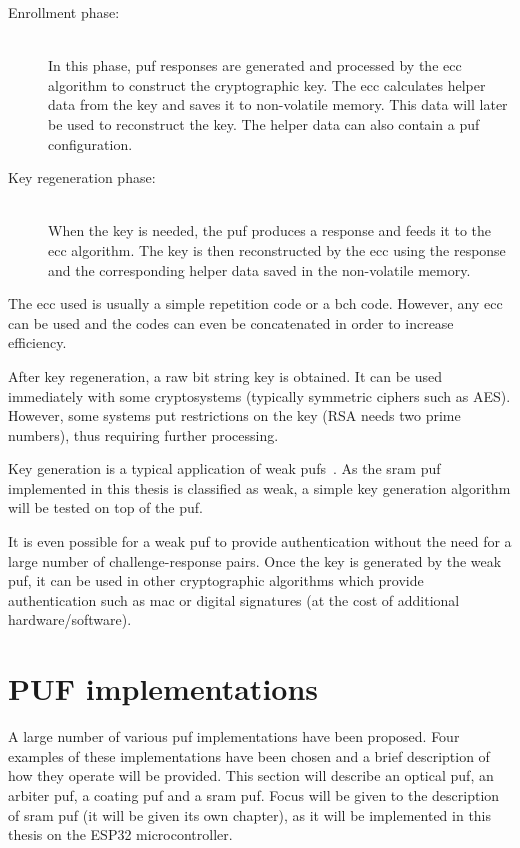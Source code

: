 \begin{description}
    \item[Enrollment phase:] \hfill \\ In this phase, \gls{puf} responses are generated and processed by the \gls{ecc} algorithm to construct the cryptographic key. The \gls{ecc} calculates helper data from the key and saves it to non-volatile memory. This data will later be used to reconstruct the key. The helper data can also contain a \gls{puf} configuration.
    \item[Key regeneration phase:] \hfill \\ When the key is needed, the \gls{puf} produces a response and feeds it to the \gls{ecc} algorithm. The key is then reconstructed by the \gls{ecc} using the response and the corresponding helper data saved in the non-volatile memory.
\end{description}

The \gls{ecc} used is usually a simple repetition code or a \gls{bch} code. However, any \gls{ecc} can be used and the codes can even be concatenated in order to increase efficiency.~\cite{Bosch2008}

After key regeneration, a raw bit string key is obtained. It can be used immediately with some cryptosystems (typically symmetric ciphers such as AES). However, some systems put restrictions on the key (RSA needs two prime numbers), thus requiring further processing. %

Key generation is a typical application of weak \glspl{puf}~\cite{Herder2014}. As the \gls{sram} \gls{puf} implemented in this thesis is classified as weak, a simple key generation algorithm will be tested on top of the \gls{puf}.

It is even possible for a weak \gls{puf} to provide authentication without the need for a large number of challenge-response pairs. Once the key is generated by the weak \gls{puf}, it can be used in other cryptographic algorithms which provide authentication such as \gls{mac} or digital signatures (at the cost of additional hardware/software).~\cite{Herder2014}


\section{PUF implementations}

A large number of various \gls{puf} implementations have been proposed. Four examples of these implementations have been chosen and a brief description of how they operate will be provided. This section will describe an optical \gls{puf}, an arbiter \gls{puf}, a coating \gls{puf} and a \gls{sram} \gls{puf}. Focus will be given to the description of \gls{sram} \gls{puf} (it will be given its own chapter), as it will be implemented in this thesis on the ESP32 microcontroller.

